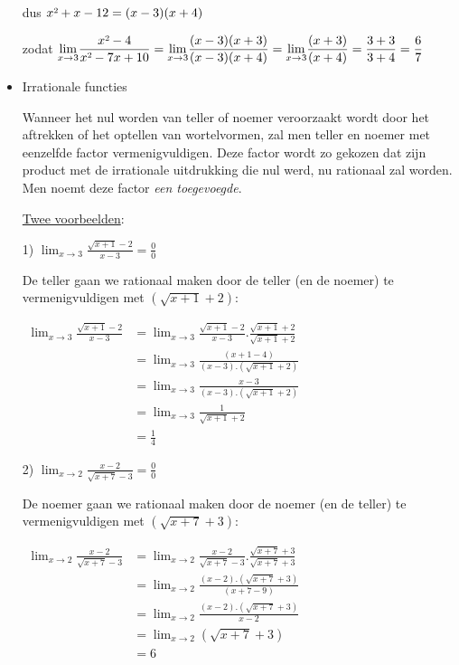 \begin{itemize}
dus $x\text{\texttwosuperior}+x-12=(x-3)(x+4)$

zodat ${\displaystyle {\displaystyle \lim_{x\to3}}\frac{x\text{\texttwosuperior}-4}{x\text{\texttwosuperior}-7x+10}={\displaystyle \lim_{x\to3}}\frac{(x-3)(x+3)}{(x-3)(x+4)}={\displaystyle \lim_{x\to3}}\frac{(x+3)}{(x+4)}=\frac{3+3}{3+4}=\frac{6}{7}}$


\item{Irrationale functies}

Wanneer het nul worden van teller of noemer veroorzaakt wordt door
het aftrekken of het optellen van wortelvormen, zal men teller en
noemer met eenzelfde factor vermenigvuldigen. Deze factor wordt zo
gekozen dat zijn product met de irrationale uitdrukking die nul werd,
nu rationaal zal worden. Men noemt deze factor \emph{een toegevoegde}.\medskip{}


\noindent \uline{Twee voorbeelden}:

\medskip{}


1) ${\displaystyle {\displaystyle \lim_{x\to3}}\frac{\sqrt{x+1}-2}{x-3}=\frac{0}{0}}$

De teller gaan we rationaal maken door de teller (en de noemer) te
vermenigvuldigen met $\left(\sqrt{x+1}+2\right)$:

$\begin{array}{cl}
{\displaystyle {\displaystyle \lim_{x\to3}}\frac{\sqrt{x+1}-2}{x-3}} & {\displaystyle ={\displaystyle \lim_{x\to3}}\frac{\sqrt{x+1}-2}{x-3}.\frac{\sqrt{x+1}+2}{\sqrt{x+1}+2}}\\
& {\displaystyle ={\displaystyle \lim_{x\to3}}\frac{\left(x+1-4\right)}{\left(x-3\right).\left(\sqrt{x+1}+2\right)}}\\
& {\displaystyle ={\displaystyle \lim_{x\to3}}\frac{x-3}{\left(x-3\right).\left(\sqrt{x+1}+2\right)}}\\
& {\displaystyle ={\displaystyle \lim_{x\to3}}\frac{1}{\sqrt{x+1}+2}}\\
& =\frac{1}{4}
\end{array}$

\medskip{}


2) ${\displaystyle {\displaystyle \lim_{x\to2}}\frac{x-2}{\sqrt{x+7}-3}=\frac{0}{0}}$

De noemer gaan we rationaal maken door de noemer (en de teller) te
vermenigvuldigen met $\left(\sqrt{x+7}+3\right)$:

$\begin{array}{cl}
{\displaystyle {\displaystyle \lim_{x\to2}}\frac{x-2}{\sqrt{x+7}-3}} & {\displaystyle ={\displaystyle \lim_{x\to2}}\frac{x-2}{\sqrt{x+7}-3}.\frac{\sqrt{x+7}+3}{\sqrt{x+7}+3}}\\
& {\displaystyle ={\displaystyle \lim_{x\to2}}\frac{\left(x-2\right).\left(\sqrt{x+7}+3\right)}{\left(x+7-9\right)}}\\
& {\displaystyle ={\displaystyle \lim_{x\to2}}\frac{\left(x-2\right).\left(\sqrt{x+7}+3\right)}{x-2}}\\
& {\displaystyle ={\displaystyle \lim_{x\to2}}\left(\sqrt{x+7}+3\right)}\\
& =6
\end{array}$
\end{itemize}


